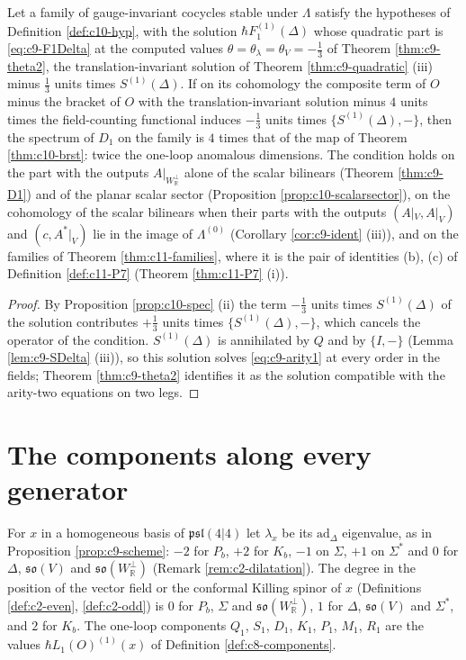 \begin{corollary}
\label{cor:c10-P7}
Let a family of gauge-invariant cocycles stable under $\Lambda$ satisfy the hypotheses of Definition \ref{def:c10-hyp}, with the solution $\hbar F_1^{(1)}(\Delta)$ whose quadratic part is \eqref{eq:c9-F1Delta} at the computed values $\theta=\theta_\lambda=\theta_V=-\tfrac13$ of Theorem \ref{thm:c9-theta2}, the translation-invariant solution of Theorem \ref{thm:c9-quadratic} (iii) minus $\tfrac13$ units times $S^{(1)}(\Delta)$. If on its cohomology the composite term of $O$ minus the bracket of $O$ with the translation-invariant solution minus $4$ units times the field-counting functional induces $-\tfrac13$ units times $\{S^{(1)}(\Delta),-\}$, then the spectrum of $D_1$ on the family is $4$ times that of the map of Theorem \ref{thm:c10-brst}: twice the one-loop anomalous dimensions. The condition holds on the part with the outputs $A|_{W_{\mathbb R}^\perp}$ alone of the scalar bilinears (Theorem \ref{thm:c9-D1}) and of the planar scalar sector (Proposition \ref{prop:c10-scalarsector}), on the cohomology of the scalar bilinears when their parts with the outputs $(A|_V,A|_V)$ and $(c,A^*|_V)$ lie in the image of $\Lambda^{(0)}$ (Corollary \ref{cor:c9-ident} (iii)), and on the families of Theorem \ref{thm:c11-families}, where it is the pair of identities (b), (c) of Definition \ref{def:c11-P7} (Theorem \ref{thm:c11-P7} (i)).
\end{corollary}

\begin{proof}
By Proposition \ref{prop:c10-spec} (ii) the term $-\tfrac13$ units times $S^{(1)}(\Delta)$ of the solution contributes $+\tfrac13$ units times $\{S^{(1)}(\Delta),-\}$, which cancels the operator of the condition. $S^{(1)}(\Delta)$ is annihilated by $Q$ and by $\{I,-\}$ (Lemma \ref{lem:c9-SDelta} (iii)), so this solution solves \eqref{eq:c9-arity1} at every order in the fields; Theorem \ref{thm:c9-theta2} identifies it as the solution compatible with the arity-two equations on two legs.
\end{proof}

\section{The components along every generator}

For $x$ in a homogeneous basis of $\mathfrak{psl}(4|4)$ let $\lambda_x$ be its $\mathrm{ad}_\Delta$ eigenvalue, as in Proposition \ref{prop:c9-scheme}: $-2$ for $P_b$, $+2$ for $K_b$, $-1$ on $\Sigma$, $+1$ on $\Sigma^*$ and $0$ for $\Delta$, $\mathfrak{so}(V)$ and $\mathfrak{so}(W_{\mathbb R}^\perp)$ (Remark \ref{rem:c2-dilatation}). The degree in the position of the vector field or the conformal Killing spinor of $x$ (Definitions \ref{def:c2-even}, \ref{def:c2-odd}) is $0$ for $P_b$, $\Sigma$ and $\mathfrak{so}(W_{\mathbb R}^\perp)$, $1$ for $\Delta$, $\mathfrak{so}(V)$ and $\Sigma^*$, and $2$ for $K_b$. The one-loop components $Q_1$, $S_1$, $D_1$, $K_1$, $P_1$, $M_1$, $R_1$ are the values $\hbar L_1(O)^{(1)}(x)$ of Definition \ref{def:c8-components}.


